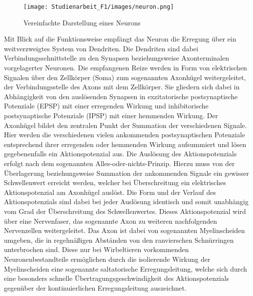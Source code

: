 \begin{figure}[H]
    \centering
    \texttt{[image: Studienarbeit\_F1/images/neuron.png]}
    \caption[Vereinfachte Darstellung eines Neurons]{Vereinfachte Darstellung eines Neurons\footnotemark}
    \label{fig:neuron}
\end{figure}
Mit Blick auf die Funktionsweise empfängt das Neuron die Erregung über ein weitverzweigtes System von Dendriten. Die Dendriten sind dabei Verbindungsschnittstelle zu den Synapsen beziehungsweise Axonterminalen vorgelagerter Neuronen. Die empfangenen Reize werden in Form von elektrischen Signalen über den Zellkörper (Soma) zum sogenannten Axonhügel weitergeleitet, der Verbindungsstelle des Axons mit dem Zellkörper. Sie gliedern sich dabei in Abhängigkeit von den auslösenden Synapsen in exzitatorische postsynaptische Potenziale (EPSP) mit einer erregenden Wirkung und inhibitorische postsynaptische Potenziale (IPSP) mit einer hemmenden Wirkung.\newline
Der Axonhügel bildet den zentralen Punkt der Summation der verschiedenen Signale. Hier werden die verschiedenen vielen ankommenden postsynaptischen Potenziale entsprechend ihrer erregenden oder hemmenden Wirkung aufsummiert und lösen gegebenenfalls ein Aktionspotenzial aus. Die Auslösung des Aktionspotenzials erfolgt nach dem sogenannten \glqq Alles-oder-nichts\grqq-Prinzip. Hierzu muss von der Überlagerung beziehungsweise Summation der ankommenden Signale ein gewisser Schwellenwert erreicht werden, welcher bei Überschreitung ein elektrisches Aktionspotenzial am Axonhügel auslöst. Die Form und der Verlauf des Aktionspotenzials sind dabei bei jeder Auslösung identisch und somit unabhängig vom Grad der Überschreitung des Schwellenwertes.\newline
Dieses Aktionspotenzial wird über eine Nervenfaser, das sogenannte Axon zu weiteren nachfolgenden Nervenzellen weitergeleitet.\newline
Das Axon ist dabei von sogenannten Myelinscheiden umgeben, die in regelmäßigen Abständen von den ranvierschen Schnürringen unterbrochen sind. Diese nur bei Wirbeltieren vorkommenden Neuronenbestandteile ermöglichen durch die isolierende Wirkung der Myelinscheiden eine sogenannte saltatorische Erregungsleitung, welche sich durch eine besonders schnelle Übertragungsgeschwindigkeit des Aktionspotenzials gegenüber der kontinuierlichen Erregungsleitung auszeichnet.\newline
